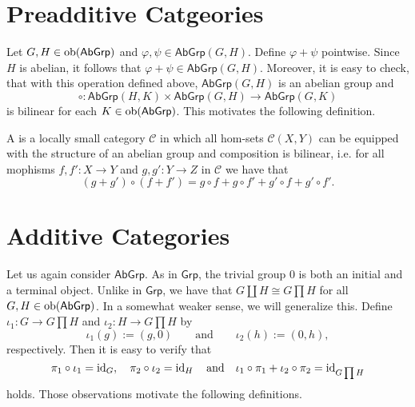 \section{Preadditive Catgeories}
Let $G,H \in \operatorname{ob}(\mathsf{AbGrp})$ and $\varphi,\psi \in \mathsf{AbGrp}(G,H)$. Define $\varphi + \psi$ pointwise. Since $H$ is abelian, it follows that $\varphi + \psi \in \mathsf{AbGrp}(G,H)$. Moreover, it is easy to check, that with this operation defined above, $\mathsf{AbGrp}(G,H)$ is an abelian group and 
\begin{equation*}
	\circ : \mathsf{AbGrp}(H,K) \times \mathsf{AbGrp}(G,H) \to \mathsf{AbGrp}(G,K)
\end{equation*}
\noindent is bilinear for each $K \in \operatorname{ob}(\mathsf{AbGrp})$. This motivates the following definition. 

\begin{definition}
	A  is a locally small category $\mathcal{C}$ in which all hom-sets $\mathcal{C}(X,Y)$ can be equipped with the structure of an abelian group and composition is bilinear, i.e. for all mophisms $f,f' : X \to Y$ and $g,g' : Y \to Z$ in $\mathcal{C}$ we have that
	\begin{equation}
		(g + g') \circ (f + f') = g \circ f + g \circ f' + g' \circ f + g' \circ f'.
	\end{equation}
\end{definition}

\section{Additive Categories}
Let us again consider $\mathsf{AbGrp}$. As in $\mathsf{Grp}$, the trivial group $0$ is both an initial and a terminal object. Unlike in $\mathsf{Grp}$, we have that $G \coprod H \cong G \prod H$ for all $G,H \in \operatorname{ob}(\mathsf{AbGrp})$. In a somewhat weaker sense, we will generalize this. Define $\iota_1 : G \to G \prod H$ and $\iota_2 : H \to G \prod H$ by
\begin{equation*}
	\iota_1(g) := (g,0) \qquad \text{and} \qquad \iota_2(h) := (0,h),
\end{equation*}
\noindent respectively. Then it is easy to verify that 
\begin{equation*}
	\pi_1\circ\iota_1 = \operatorname{id}_G, \quad \pi_2\circ\iota_2 = \operatorname{id}_H \quad \text{and} \quad \iota_1 \circ \pi_1 + \iota_2 \circ \pi_2 = \operatorname{id}_{G \prod H}
\end{equation*}
\noindent holds. Those observations motivate the following definitions.

